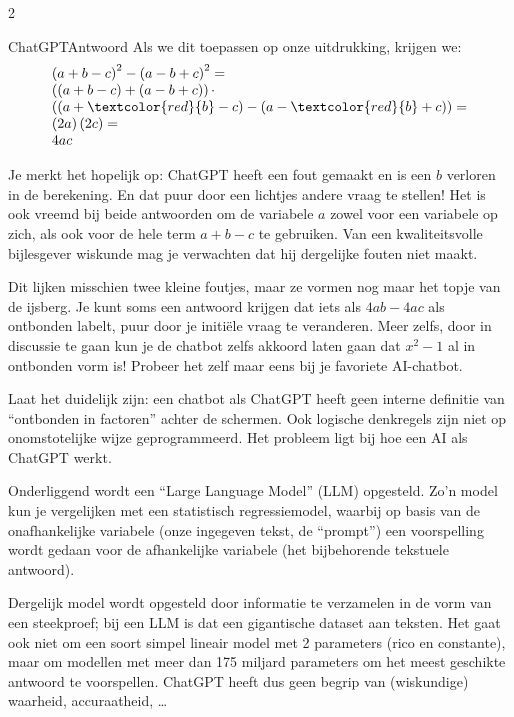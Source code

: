 \begin{multicols} {2}
\begin{kader}{ChatGPT}{Antwoord}
        Als we dit toepassen op onze uitdrukking, krijgen we:
        \[
        \begin{array}{l}
        \left(a+b-c\right)^2 - \left(a-b+c\right)^2 =\\ 
        \left((a+b-c) + (a-b+c)\right)\cdot\\
        \left((a+\textcolor{red}{b}-c) - (a-\textcolor{red}{b}+c)\right)=\\
        \left(2a\right)\left(2c\right)=\\
        4ac
        \end{array}
        \]
    \end{kader}
    Je merkt het hopelijk op: ChatGPT heeft een fout gemaakt en is een \(b\) verloren in de berekening.
    En dat puur door een lichtjes andere vraag te stellen!
    Het is ook vreemd bij beide antwoorden om de variabele \(a\) zowel voor een variabele op zich, als ook voor de hele term \(a+b-c\) te gebruiken.
    Van een kwaliteitsvolle bijlesgever wiskunde mag je verwachten dat hij dergelijke fouten niet maakt.
    
    Dit lijken misschien twee kleine foutjes, maar ze vormen nog maar het topje van de ijsberg.
    Je kunt soms een antwoord krijgen dat iets als \(4ab-4ac\) als ontbonden labelt, puur door je initiële vraag te veranderen.
    Meer zelfs, door in discussie te gaan kun je de chatbot zelfs akkoord laten gaan dat \(x^2-1\) al in ontbonden vorm is!
    Probeer het zelf maar eens bij je favoriete AI-chatbot.
    
    Laat het duidelijk zijn: een chatbot als ChatGPT heeft geen interne definitie van ``ontbonden in factoren'' achter de schermen.
    Ook logische denkregels zijn niet op onomstotelijke wijze geprogrammeerd.
    Het probleem ligt bij hoe een AI als ChatGPT werkt.
 
    Onderliggend wordt een ``Large Language Model'' (LLM) opgesteld.
    Zo'n model kun je vergelijken met een statistisch regressiemodel, waarbij op basis van de onafhankelijke variabele (onze ingegeven tekst, de ``prompt'') een voorspelling wordt gedaan voor de afhankelijke variabele (het bijbehorende tekstuele antwoord).
    
    Dergelijk model wordt opgesteld door informatie te verzamelen in de vorm van een steekproef; bij een LLM is dat een gigantische dataset aan teksten.
    Het gaat ook niet om een soort simpel lineair model met 2 parameters (rico en constante), maar om modellen met meer dan 175 miljard parameters om het meest geschikte antwoord te voorspellen.
    ChatGPT heeft dus geen begrip van (wiskundige) waarheid, accuraatheid, \ldots
    

\end{multicols}
